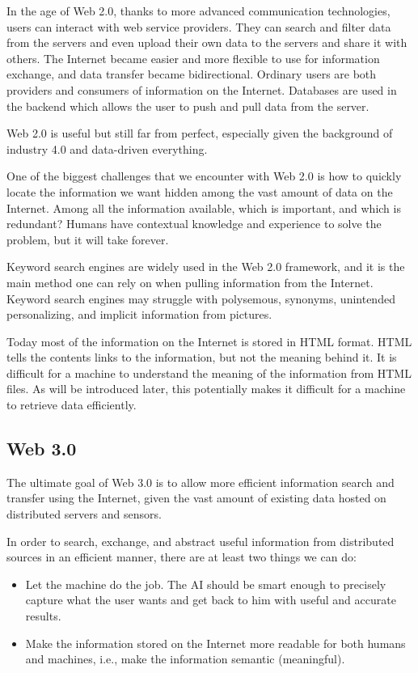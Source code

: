 In the age of Web 2.0, thanks to more advanced communication technologies, users can interact with web service providers. They can search and filter data from the servers and even upload their own data to the servers and share it with others. The Internet became easier and more flexible to use for information exchange, and data transfer became bidirectional. Ordinary users are both providers and consumers of information on the Internet. Databases are used in the backend which allows the user to push and pull data from the server.

Web 2.0 is useful but still far from perfect, especially given the background of industry 4.0 and data-driven everything.

One of the biggest challenges that we encounter with Web 2.0 is how to quickly locate the information we want hidden among the vast amount of data on the Internet. Among all the information available, which is important, and which is redundant? Humans have contextual knowledge and experience to solve the problem, but it will take forever.

Keyword search engines are widely used in the Web 2.0 framework, and it is the main method one can rely on when pulling information from the Internet. Keyword search engines may struggle with polysemous, synonyms, unintended personalizing, and implicit information from pictures.

Today most of the information on the Internet is stored in HTML format. HTML tells the contents links to the information, but not the meaning behind it. It is difficult for a machine to understand the meaning of the information from HTML files. As will be introduced later, this potentially makes it difficult for a machine to retrieve data efficiently.

\subsection{Web 3.0}

The ultimate goal of Web 3.0 is to allow more efficient information search and transfer using the Internet, given the vast amount of existing data hosted on distributed servers and sensors.

In order to search, exchange, and abstract useful information from distributed sources in an efficient manner, there are at least two things we can do:

\begin{itemize}
  \item Let the machine do the job. The AI should be smart enough to precisely capture what the user wants and get back to him with useful and accurate results.
  \item Make the information stored on the Internet more readable for both humans and machines, i.e., make the information semantic (meaningful).
\end{itemize}

